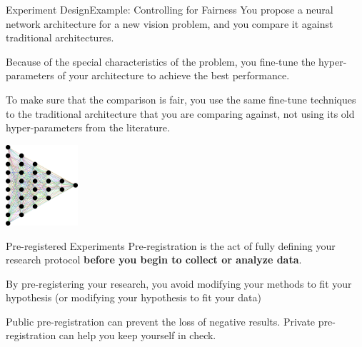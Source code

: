 \documentclass{beamer}
\begin{document}
\begin{CJK}{UTF8}{ipxm}
\begin{frame}{Experiment Design}{Example: Controlling for Fairness}
  You propose a neural network architecture for a new vision problem, and you compare it against traditional architectures.\bigskip

  Because of the special characteristics of the problem, you fine-tune the hyper-parameters of your architecture to achieve the best performance.\bigskip

  To make sure that the comparison is fair, you use the same fine-tune techniques to the traditional architecture that you are comparing against, not using its old hyper-parameters from the literature.

  \hfill\includegraphics[width=0.2\textwidth]{../img/pixabay_neuralnetwork_gordonjohnson}
\end{frame}

\begin{frame}{Pre-registered Experiments}
  Pre-registration is the act of fully defining your research protocol {\bf before you begin to collect or analyze data}.
  \bigskip

  By pre-registering your research, you avoid modifying your methods to fit your hypothesis (or modifying your hypothesis to fit your data)
  \bigskip

  Public pre-registration can prevent the loss of negative results. Private pre-registration can help you keep yourself in check.\bigskip


\end{frame}
\end{CJK}
\end{document}
